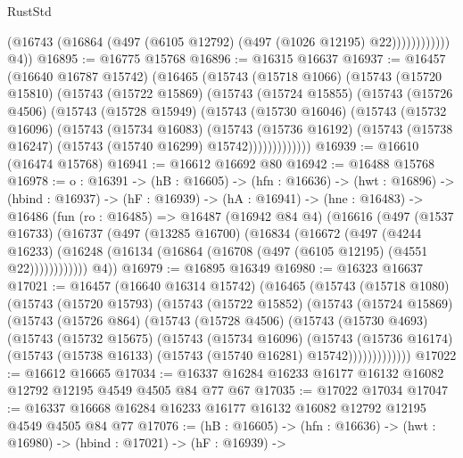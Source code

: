\begin{lexlean}{RustStd}
\begin{coremodule}
                        (@16743 (@16864 (@497 (@6105 @12792) (@497 (@1026 @12195) @22))))))))))))
        @4))
@16895 := @16775 @15768
@16896 := @16315 @16637
@16937 := @16457
    (@16640 @16787 @15742)
    (@16465
      (@15743
        (@15718 @1066)
        (@15743
          (@15720 @15810)
          (@15743
            (@15722 @15869)
            (@15743
              (@15724 @15855)
              (@15743
                (@15726 @4506)
                (@15743
                  (@15728 @15949)
                  (@15743
                    (@15730 @16046)
                    (@15743
                      (@15732 @16096)
                      (@15743
                        (@15734 @16083)
                        (@15743
                          (@15736 @16192)
                          (@15743 (@15738 @16247) (@15743 (@15740 @16299) @15742)))))))))))))
@16939 := @16610 (@16474 @15768)
@16941 := @16612 @16692 @80
@16942 := @16488 @15768
@16978 := {o : @16391} ->
  (hB : @16605) ->
  (hfn : @16636) ->
  (hwt : @16896) ->
  (hbind : @16937) ->
  (hF : @16939) ->
  (hA : @16941) ->
  (hne : @16483) ->
  @16486
    (fun (ro : @16485) =>
    @16487
      (@16942 @84 @4)
      (@16616
        (@497
          (@1537 @16733)
          (@16737
            (@497
              (@13285 @16700)
              (@16834
                (@16672
                  (@497
                    (@4244 @16233)
                    (@16248 (@16134 (@16864 (@16708 (@497 (@6105 @12195) (@4551 @22))))))))))))
        @4))
@16979 := @16895 @16349
@16980 := @16323 @16637
@17021 := @16457
    (@16640 @16314 @15742)
    (@16465
      (@15743
        (@15718 @1080)
        (@15743
          (@15720 @15793)
          (@15743
            (@15722 @15852)
            (@15743
              (@15724 @15869)
              (@15743
                (@15726 @864)
                (@15743
                  (@15728 @4506)
                  (@15743
                    (@15730 @4693)
                    (@15743
                      (@15732 @15675)
                      (@15743
                        (@15734 @16096)
                        (@15743
                          (@15736 @16174)
                          (@15743 (@15738 @16133) (@15743 (@15740 @16281) @15742)))))))))))))
@17022 := @16612 @16665
@17034 := @16337 @16284 @16233 @16177 @16132 @16082 @12792 @12195 @4549 @4505 @84 @77 @67
@17035 := @17022 @17034
@17047 := @16337 @16668 @16284 @16233 @16177 @16132 @16082 @12792 @12195 @4549 @4505 @84 @77
@17076 := (hB : @16605) ->
  (hfn : @16636) ->
  (hwt : @16980) ->
  (hbind : @17021) ->
  (hF : @16939) ->

\end{coremodule}
\end{lexlean}
